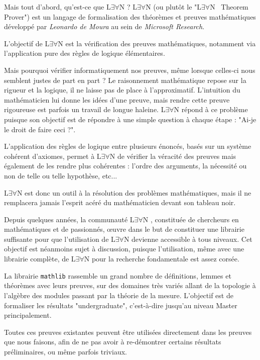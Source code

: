 \documentclass[a4paper, 11pt, twoside]{report}
\newcommand{\LEAN}{L$\exists\forall$N }
\begin{document}
Mais tout d'abord, qu'est-ce que \LEAN ? \LEAN (ou plutôt le "\LEAN\, Theorem Prover") est un langage de formalisation des théorèmes et preuves mathématiques développé par \textit{Leonardo de Moura} au sein de \textit{Microsoft Research}.

L'objectif de \LEAN est la vérification des preuves mathématiques, notamment via l'application pure des règles de logique élémentaires.

Mais pourquoi vérifier informatiquement nos preuves, même lorsque celles-ci nous semblent justes de part en part ? Le raisonnement mathématique repose sur la rigueur et la logique, il ne laisse pas de place à l'approximatif. L'intuition du mathématicien lui donne les idées d'une preuve, mais rendre cette preuve rigoureuse est parfois un travail de longue haleine. \LEAN répond à ce problème puisque son objectif est de répondre à une simple question à chaque étape : "Ai-je le droit de faire ceci ?".

L'application des règles de logique entre plusieurs énoncés, basés sur un système cohérent d'axiomes, permet à \LEAN de vérifier la véracité des preuves mais également de les rendre plus cohérentes : l'ordre des arguments, la nécessité ou non de telle ou telle hypothèse, etc... 

\LEAN est donc un outil à la résolution des problèmes mathématiques, mais il ne remplacera jamais l'esprit acéré du mathématicien devant son tableau noir.

\medskip

Depuis quelques années, la communauté \LEAN, constituée de chercheurs en mathématiques et de passionnés, œuvre dans le but de constituer une librairie suffisante pour que l'utilisation de \LEAN devienne accessible à tous niveaux. Cet objectif est néanmoins sujet à discussion, puisque l'utilisation, même avec une librairie complète, de \LEAN pour la recherche fondamentale est assez corsée.

La librairie \verb|mathlib| rassemble un grand nombre de définitions, lemmes et théorèmes avec leurs preuves, sur des domaines très variés allant de la topologie à l'algèbre des modules passant par la théorie de la mesure. L'objectif est de formaliser les résultats "undergraduate", c'est-à-dire jusqu'au niveau Master principalement. 

Toutes ces preuves existantes peuvent être utilisées directement dans les preuves que nous faisons, afin de ne pas avoir à re-démontrer certains résultats préliminaires, ou même parfois triviaux.
\end{document}
